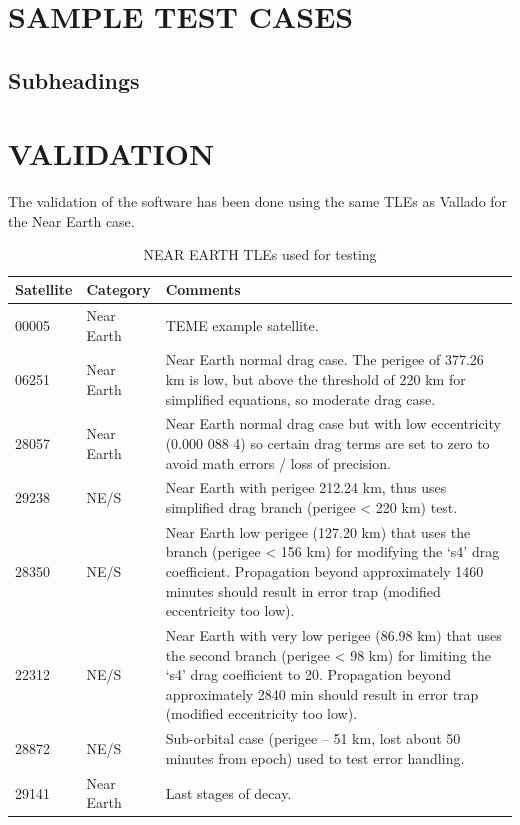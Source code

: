 \documentclass{article}
\begin{document}

\section{SAMPLE TEST CASES}
\label{sec:sampletestcases}


\subsection{Subheadings}
\label{ssec:subhead}



\section{VALIDATION}
\label{sec:validation}

The validation of the software has been done using the same TLEs as Vallado for the Near Earth case.

\begin{table}[p]
\centering
\caption{NEAR EARTH TLEs used for testing}\vspace{2mm}
\begin{tabular}{|l|l|p{14cm}|}
\hline\hline
Satellite & Category & Comments\\
\hline
00005 & Near Earth & TEME example satellite.\\
06251 &  Near Earth  & Near Earth normal drag case. The perigee of 377.26 km is low, but above the threshold of 220
km for simplified equations, so moderate drag case.\\
28057 &  Near Earth  & Near Earth normal drag case but with low eccentricity (0.000 088 4) so certain drag terms are
set to zero to avoid math errors / loss of precision.\\
29238  & NE/S  & Near Earth with perigee 212.24 km, thus uses simplified drag branch (perigee < 220 km) test.\\
28350 & NE/S  & Near Earth low perigee (127.20 km) that uses the branch (perigee < 156 km) for modifying
the ‘s4’ drag coefficient. Propagation beyond approximately 1460 minutes should result in
error trap (modified eccentricity too low).\\
22312  & NE/S  & Near Earth with very low perigee (86.98 km) that uses the second branch (perigee < 98 km)
for limiting the ‘s4’ drag coefficient to 20. Propagation beyond approximately 2840 min
should result in error trap (modified eccentricity too low).\\
28872  & NE/S  & Sub-orbital case (perigee – 51 km, lost about 50 minutes from epoch) used to test error handling.\\
29141  & Near Earth  & Last stages of decay.\\
\hline\hline
\end{tabular}
\label{tab:res}
\end{table}
\end{document}
